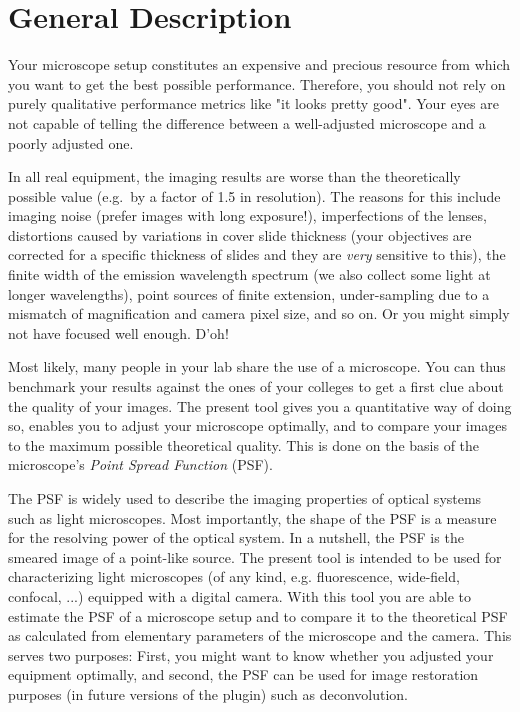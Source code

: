 \section*{}

\section{General Description}
Your microscope setup constitutes an expensive and precious resource from which you want to get the best possible performance. Therefore, you should not rely on purely qualitative performance metrics like "it looks pretty good". Your eyes are not capable of telling the difference between a well-adjusted microscope and a poorly adjusted one.

In all real equipment, the imaging results are worse than the theoretically possible value (e.g.~by a factor of 1.5 in resolution). The reasons for this include imaging noise (prefer images with long exposure!), imperfections of the lenses, distortions caused by variations in cover slide thickness (your objectives are corrected for a specific thickness of slides and they are \emph{very} sensitive to this), the finite width of the emission wavelength spectrum (we also collect some light at longer wavelengths), point sources of finite extension, under-sampling due to a mismatch of magnification and camera pixel size, and so on. Or you might simply not have focused well enough. D'oh!

Most likely, many people in your lab share the use of a microscope. You can thus benchmark your results against the ones of your colleges to get a first clue about the quality of your images. The present tool gives you a quantitative way of doing so, enables you to adjust your microscope optimally, and to compare your images to the maximum possible theoretical quality. This is done on the basis of the microscope's \emph{Point Spread Function} (PSF).

The PSF is widely used to describe the imaging properties of optical systems such as light microscopes. Most importantly, the shape of the PSF is a measure for the resolving power of the optical system. In a nutshell, the PSF is the smeared image of a point-like source. The present tool is intended to be used for characterizing light microscopes (of any kind, e.g. fluorescence, wide-field, confocal, ...) equipped with a digital camera. With this tool you are able to estimate the PSF of a microscope setup and to compare it to the theoretical PSF as calculated from elementary parameters of the microscope and the camera. This serves two purposes: First, you might want to know whether you adjusted your equipment optimally, and second, the PSF can be used for image restoration purposes (in future versions of the plugin) such as deconvolution. 


